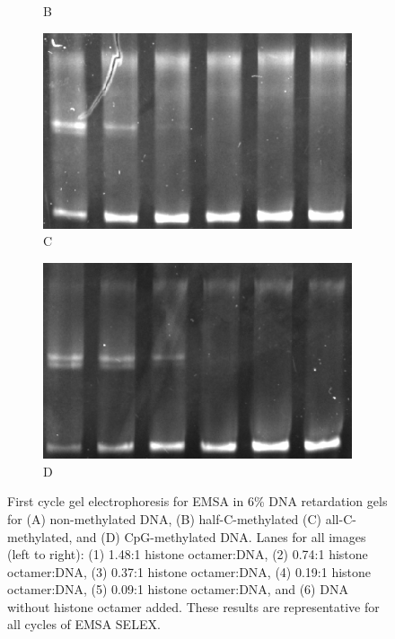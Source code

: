\documentclass[parskip=full, numbers=noenddot]{scrreprt}
\begin{document}
\begin{figure}[htpb]
\begin{subfigure}[htpb]{0.4\textwidth}
    \caption{B}
    \label{fig:reconstnuc_b}
  \end{subfigure}
  \begin{subfigure}[htpb]{0.4\textwidth}
    \centering
    \includegraphics[width=\textwidth]{reconstnuc_c}
    \caption{C}
    \label{fig:reconstnuc_c}
  \end{subfigure}
  \begin{subfigure}[htpb]{0.4\textwidth}
    \centering
    \includegraphics[width=\textwidth]{reconstnuc_d}
    \caption{D}
    \label{fig:reconstnuc_d}
  \end{subfigure}
  \caption{First cycle gel electrophoresis for EMSA in 6\% DNA retardation gels for (A) non-methylated DNA, (B) half-C-methylated (C) all-C-methylated, and (D) CpG-methylated DNA. Lanes for all images (left to right): (1) 1.48:1 histone octamer:DNA, (2) 0.74:1 histone octamer:DNA, (3) 0.37:1 histone octamer:DNA, (4) 0.19:1 histone octamer:DNA, (5) 0.09:1 histone octamer:DNA, and (6) DNA without histone octamer added.  These results are representative for all cycles of EMSA SELEX.}
  \label{fig:reconstnuc}
\end{figure}
\end{document}
